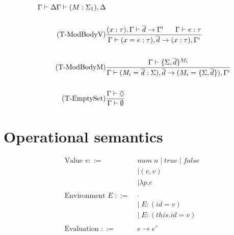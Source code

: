 \documentclass[10pt,a4paper,draft]{article}
\begin{document}
\begin{flushleft}
\begin{align*}
{\;\;\;\;\;\;\Gamma \vdash \Delta}
{\Gamma \vdash (M:\Sigma_{1}),\Delta}\\
\\
\tag{T-ModBodyV}
&\frac{ (x:\tau),\Gamma \vdash \overline{d} \rightarrow \Gamma' \;\;\;\;\;\; \Gamma \vdash e:\tau}
{\Gamma \vdash (x=e:\tau),\overline{d} \rightarrow (x:\tau),\Gamma'} \\
\\
\tag{T-ModBodyM}
&\frac{\Gamma \vdash \lbrace\Sigma, \overline{d} \rbrace^{M_{i}} }
{\Gamma \vdash (\mathit{M_{i}=\overline{d}}:\Sigma),\overline{d} \rightarrow (M_{i}=\lbrace \Sigma,\overline{d} \rbrace),\Gamma'} \\
\\
\tag{T-EmptySet}
&\frac{\Gamma \vdash \Diamond}
{\Gamma \vdash \emptyset}
\end{align*}

\section{Operational semantics}
\begin{align*}
\text{Value }v ::=\;&\mathit{num\;n} \; | \; \mathit{true} \; | \; \mathit{false} \\
&| (v,v) \\
&| \lambda p.e\\
\\
\text{Environment } E\; ::= \;&\cdot \\
&|\;E:(\mathit{id}=v) \\
&|\;E:(\mathit{this.id}=v) \\ 
\\
\text{Evaluation } ::= &e \rightarrow e' \\
\end{align*}

\end{flushleft}
\end{document}
